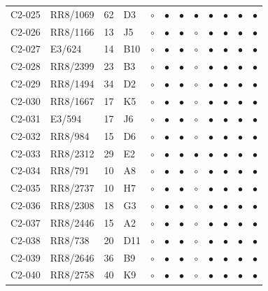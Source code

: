 {\begin{longtable}{llrp{3.9cm}cccccccc}
    C2-025 & RR8/1069 & 62 & D3 & $\circ$ & $\bullet$ & $\bullet$ & $\bullet$ & $\bullet$ & $\bullet$ & $\bullet$ & $\bullet$ \\
    C2-026 & RR8/1166 & 13 & J5 & $\circ$ & $\bullet$ & $\bullet$ & $\circ$ & $\bullet$ & $\bullet$ & $\bullet$ & $\bullet$ \\
    C2-027 & E3/624 & 14 & B10 & $\circ$ & $\bullet$ & $\bullet$ & $\circ$ & $\bullet$ & $\bullet$ & $\bullet$ & $\bullet$ \\
    C2-028 & RR8/2399 & 23 & B3 & $\circ$ & $\bullet$ & $\bullet$ & $\circ$ & $\bullet$ & $\bullet$ & $\bullet$ & $\bullet$ \\
    C2-029 & RR8/1494 & 34 & D2 & $\circ$ & $\bullet$ & $\bullet$ & $\circ$ & $\bullet$ & $\bullet$ & $\bullet$ & $\bullet$ \\
    C2-030 & RR8/1667 & 17 & K5 & $\circ$ & $\bullet$ & $\bullet$ & $\circ$ & $\bullet$ & $\bullet$ & $\bullet$ & $\bullet$ \\
    C2-031 & E3/594 & 17 & J6 & $\circ$ & $\bullet$ & $\bullet$ & $\circ$ & $\bullet$ & $\bullet$ & $\bullet$ & $\bullet$ \\
    C2-032 & RR8/984 & 15 & D6 & $\circ$ & $\bullet$ & $\bullet$ & $\circ$ & $\bullet$ & $\bullet$ & $\bullet$ & $\bullet$ \\
    C2-033 & RR8/2312 & 29 & E2 & $\circ$ & $\bullet$ & $\bullet$ & $\bullet$ & $\bullet$ & $\bullet$ & $\bullet$ & $\bullet$ \\
    C2-034 & RR8/791 & 10 & A8 & $\circ$ & $\bullet$ & $\bullet$ & $\circ$ & $\bullet$ & $\bullet$ & $\bullet$ & $\bullet$ \\
    C2-035 & RR8/2737 & 10 & H7 & $\circ$ & $\bullet$ & $\bullet$ & $\circ$ & $\bullet$ & $\bullet$ & $\bullet$ & $\bullet$ \\
    C2-036 & RR8/2308 & 18 & G3 & $\circ$ & $\bullet$ & $\bullet$ & $\circ$ & $\bullet$ & $\bullet$ & $\bullet$ & $\bullet$ \\
    C2-037 & RR8/2446 & 15 & A2 & $\circ$ & $\bullet$ & $\bullet$ & $\circ$ & $\bullet$ & $\bullet$ & $\bullet$ & $\bullet$ \\
    C2-038 & RR8/738 & 20 & D11 & $\circ$ & $\bullet$ & $\bullet$ & $\circ$ & $\bullet$ & $\bullet$ & $\bullet$ & $\bullet$ \\
    C2-039 & RR8/2646 & 36 & B9 & $\circ$ & $\bullet$ & $\bullet$ & $\circ$ & $\bullet$ & $\bullet$ & $\bullet$ & $\bullet$ \\
    C2-040 & RR8/2758 & 40 & K9 & $\circ$ & $\bullet$ & $\bullet$ & $\circ$ & $\bullet$ & $\bullet$ & $\bullet$ & $\bullet$ \\

\end{longtable}}
